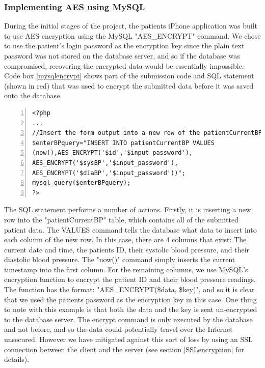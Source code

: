 \documentclass[11pt]{article}
\begin{document}
\subsubsection{Implementing AES using MySQL}

During the initial stages of the project, the patients iPhone application was built to use AES encryption using the MySQL "AES\_ENCRYPT" command. We chose to use the patient's login password as the encryption key since the plain text password was not stored on the database server, and so if the database was compromised, recovering the encrypted data would be essentially impossible. Code box \ref{mysqlencrypt} shows part of the submission code and SQL statement (shown in red) that was used to encrypt the submitted data before it was saved onto the database.



\begin{lstlisting}[float=ht,numbers=left,frame=lines,caption="Example code for submitting patient BP readings with included AES encrypt commands",label=mysqlencrypt,showstringspaces=false]
<?php
...
//Insert the form output into a new row of the patientCurrentBP table
$enterBPquery="INSERT INTO patientCurrentBP VALUES
(now(),AES_ENCRYPT('$id','$input_password'),
AES_ENCRYPT('$sysBP','$input_password'),
AES_ENCRYPT('$diaBP','$input_password'))";
mysql_query($enterBPquery);
?>

\end{lstlisting}


The SQL statement performs a number of actions. Firstly, it is inserting a new row into the "patientCurrentBP" table, which contains all of the submitted patient data. The VALUES command tells the database what data to insert into each column of the new row. In this case, there are 4 columns that exist: The current date and time, the patients ID, their systolic blood pressure, and their diastolic blood pressure. The "now()" command simply inserts the current timestamp into the first column. For the remaining columns, we use MySQL's encryption function to encrypt the patient ID and their blood pressure readings. The function has the format: "AES\_ENCRYPT(\$data, \$key)", and so it is clear that we used the patients password as the encryption key in this case. One thing to note with this example is that both the data and the key is sent un-encrypted to the database server. The encrypt command is only executed by the database and not before, and so the data could potentially travel over the Internet unsecured. However we have mitigated against this sort of loss by using an SSL connection between the client and the server (see section \ref{SSLencryption} for details).
 
\end{document}
